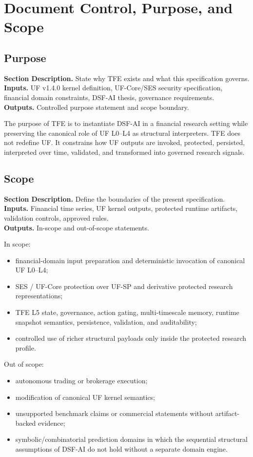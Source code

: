 \documentclass[11pt]{report}
\newcommand{\meta}[3]{\textbf{Section Description.} #1\\
\textbf{Inputs.} #2\\
\textbf{Outputs.} #3\par}
\begin{document}
\chapter{Document Control, Purpose, and Scope}
\section{Purpose}
\meta{State why TFE exists and what this specification governs.}{UF v1.4.0 kernel definition, UF-Core/SES security specification, financial domain constraints, DSF-AI thesis, governance requirements.}{Controlled purpose statement and scope boundary.}

The purpose of TFE is to instantiate DSF-AI in a financial research setting while preserving the canonical role of UF L0--L4 as structural interpreters. TFE does not redefine UF. It constrains how UF outputs are invoked, protected, persisted, interpreted over time, validated, and transformed into governed research signals.

\section{Scope}
\meta{Define the boundaries of the present specification.}{Financial time series, UF kernel outputs, protected runtime artifacts, validation controls, approved rules.}{In-scope and out-of-scope statements.}

In scope:
\begin{itemize}
    \item financial-domain input preparation and deterministic invocation of canonical UF L0--L4;
    \item SES / UF-Core protection over UF-SP and derivative protected research representations;
    \item TFE L5 state, governance, action gating, multi-timescale memory, runtime snapshot semantics, persistence, validation, and auditability;
    \item controlled use of richer structural payloads only inside the protected research profile.
\end{itemize}

Out of scope:
\begin{itemize}
    \item autonomous trading or brokerage execution;
    \item modification of canonical UF kernel semantics;
    \item unsupported benchmark claims or commercial statements without artifact-backed evidence;
    \item symbolic/combinatorial prediction domains in which the sequential structural assumptions of DSF-AI do not hold without a separate domain engine.
\end{itemize}
\end{document}
